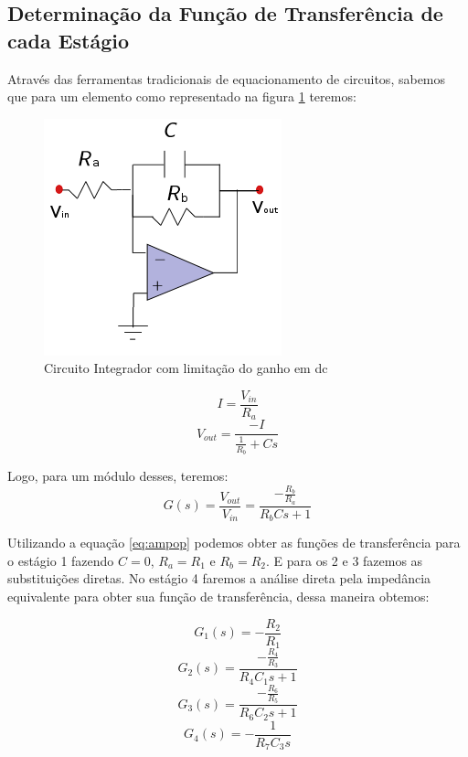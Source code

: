 \documentclass{article}
\begin{document}
\subsection{Determinação da Função de Transferência de cada Estágio}
Através das ferramentas tradicionais de equacionamento de circuitos, sabemos que para um elemento como representado na figura \ref{fig:unidade} teremos:

\begin{figure}[H]
\centering
\includegraphics[width=0.3\linewidth]{unidade}
\caption{Circuito Integrador com limitação do ganho em dc}
\label{fig:unidade}
\end{figure}
 
\begin{equation}
I = \frac{V_{in}}{R_a}
\end{equation}
\begin{equation}
V_{out} = \frac{-I}{\frac{1}{R_b} + Cs}
\end{equation}

Logo, para um módulo desses, teremos:
\begin{equation}
\label{eq:ampop}
G(s) = \frac{V_{out}}{V_{in}} = \frac{-\frac{R_b}{R_a}}{R_bCs + 1}
\end{equation}

Utilizando a equação \ref{eq:ampop} podemos obter as funções de transferência para o estágio 1 fazendo $C=0$, $R_a=R_1$ e $R_b=R_2$. E para os 2 e 3 fazemos as substituições diretas. No estágio 4 faremos a análise direta pela impedância equivalente para obter sua função de transferência, dessa maneira obtemos:

\begin{equation}
\label{eq:ft1}
G_1(s) = -\frac{R_2}{R_1}
\end{equation}
\begin{equation}
\label{eq:ft2}
G_2(s) = \frac{-\frac{R_4}{R_3}}{R_4C_1s + 1}
\end{equation}
\begin{equation}
\label{eq:ft3}
G_3(s) = \frac{-\frac{R_6}{R_5}}{R_6C_2s + 1}
\end{equation}
\begin{equation}
\label{eq:ft4}
G_4(s) = -\frac{1}{R_7C_3s}
\end{equation}
\end{document}
